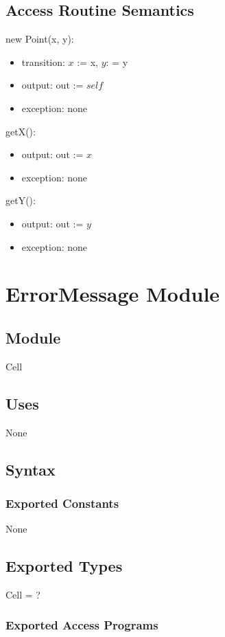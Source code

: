 \documentclass[12pt]{article}
\begin{document}
\subsection* {Access Routine Semantics}
new Point(x, y):
\begin{itemize}
\item transition: $x$ := x, $y$: = y
\item output: out := $self$
\item exception: none
\end{itemize}
getX():
\begin{itemize}
\item output: out := $x$
\item exception: none
\end{itemize}
getY():
\begin{itemize}
\item output: out := $y$
\item exception: none
\end{itemize}
\newpage




%

\section*{ErrorMessage Module}
\subsection* {Module}
Cell
\subsection* {Uses}
None
\subsection* {Syntax}
\subsubsection* {Exported Constants}
None
\subsection* {Exported Types}
Cell = ?

\subsubsection* {Exported Access Programs}
\end{document}
